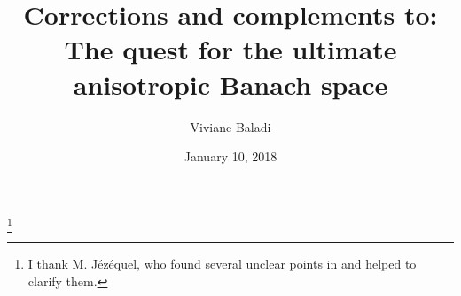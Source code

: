 \documentclass[10pt,twoside]{amsart}
\begin{document}
\newcommand{\comments}[1]{\marginpar{\footnotesize #1}} %


\newtheorem{proposition}{Proposition}[section]
\newtheorem{lemma}[proposition]{Lemma}
\newtheorem{sublemma}[proposition]{Sublemma}
\newtheorem{theorem}[proposition]{Theorem}

\newtheorem{maintheorem}{Main Theorem}
\newtheorem{corollary}[proposition]{Corollary}

\newtheorem{ex}[proposition]{Example}

\theoremstyle{remark}

\newtheorem{remark}[proposition]{Remark}

\theoremstyle{definition}
\newtheorem{definition}[proposition]{Definition}
\newcommand{\ovB}{\bar{B}}
\def\Erg{\mathrm{Erg}\, }
\def\cone{\mathbf{C}} %
\def\real{\mathbb{R}}
\def\sphere{\mathbf{S}^{d-1}}%
\def\integer{\mathbb{Z}}
\def\complex{\mathbb{C}}
\def\BBB{\mathbb{B}}
\def\supp{\mathrm{supp}}
\def\var{\mathrm{var}}
\def\sgn{\mathrm{sgn}}
\def\sp{\mathrm{sp}}
\def\id{\mathrm{id}}
\def\Imm{\mathrm{Image}}
\def\cc{\Subset}
\def\D{\mathrm {d}}
\def\I{i}
\def\E{e}
\def\Lip{\mathrm{Lip}}
\def\BB{\mathcal{B}}
\def\CC{\mathcal{C}}
\def\DD{\mathcal{D}}
\def\EE{\mathcal{E}}
\def\FF{\mathcal{F}}
\def\GG{\mathcal{G}}
\def\II{\mathcal{I}}
\def\JJ{\mathcal{J}}
\def\KK{\mathcal{K}}
\def\LL{\mathcal{L}}
\def\LLL{\mathbb{L}}
\def\MM{\mathcal{M}}
\def\NN{\mathcal{N}}
\def \OO{\mathcal {O}}
\def \PP{\mathcal {P}}
\def \QQ{\mathcal {Q}}
\def \RR{\mathcal {R}}
\def\SS{\mathcal{S}}
\def\TT{\mathcal{T}}
\def\UU{\mathcal{U}}
\def\VV{\mathcal{V}}
\def\WW{\mathcal{W}}
\def\YY{\mathcal{Y}}
\def\ZZ{\mathcal{Z}}
\def\FFF{\mathbb{F}}
\def\PPP{\mathbb{P}}




\title[The quest for the ultimate anisotropic Banach space]{
C\MakeLowercase{orrections and
complements to:}\\
T\MakeLowercase{he quest for the ultimate anisotropic} 
B\MakeLowercase{anach space}}

\date{January 10, 2018}
\author{
\vspace*{-0.4cm}
Viviane Baladi} 
\thanks{I thank M. J\'ez\'equel, who found several  unclear points in \cite{Baladijoel} and helped to clarify them.}




\maketitle
\end{document}
